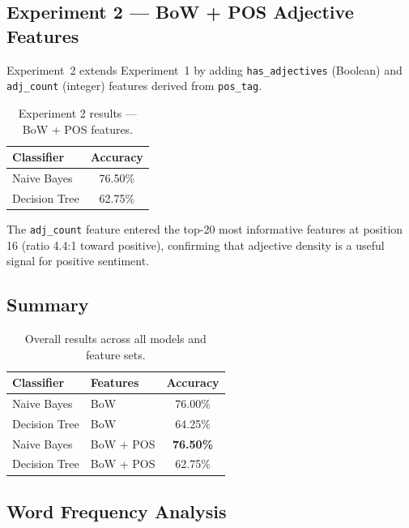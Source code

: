 \documentclass[11pt,a4paper]{article}
\begin{document}
\subsection{Experiment 2 --- BoW + POS Adjective Features}

Experiment~2 extends Experiment~1 by adding \texttt{has\_adjectives} (Boolean) and
\texttt{adj\_count} (integer) features derived from \texttt{pos\_tag}.

\begin{table}[H]
  \centering
  \caption{Experiment 2 results --- BoW + POS features.}
  \label{tab:exp2}
  \begin{tabular}{lc}
    \toprule
    \textbf{Classifier} & \textbf{Accuracy} \\
    \midrule
    Naive Bayes   & 76.50\% \\
    Decision Tree & 62.75\% \\
    \bottomrule
  \end{tabular}
\end{table}

The \texttt{adj\_count} feature entered the top-20 most informative features at position
16 (ratio 4.4:1 toward positive), confirming that adjective density is a useful
signal for positive sentiment.

\subsection{Summary}

\begin{table}[H]
  \centering
  \caption{Overall results across all models and feature sets.}
  \label{tab:summary}
  \begin{tabular}{llc}
    \toprule
    \textbf{Classifier} & \textbf{Features} & \textbf{Accuracy} \\
    \midrule
    Naive Bayes   & BoW            & 76.00\% \\
    Decision Tree & BoW            & 64.25\% \\
    Naive Bayes   & BoW + POS      & \textbf{76.50\%} \\
    Decision Tree & BoW + POS      & 62.75\% \\
    \bottomrule
  \end{tabular}
\end{table}

\subsection{Word Frequency Analysis}
\end{document}
